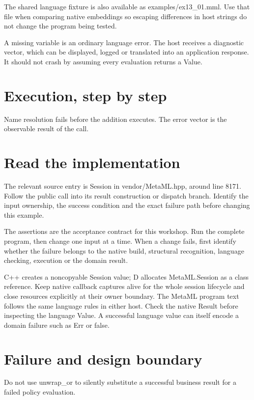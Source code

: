 The shared language fixture is also available as examples/ex13\_01.mml. Use that file when comparing native embeddings so escaping differences in host strings do not change the program being tested.

\clearpage
{}
A missing variable is an ordinary language error. The host receives a diagnostic vector, which can be displayed, logged or translated into an application response. It should not crash by assuming every evaluation returns a Value.


\section*{Execution, step by step}
Name resolution fails before the addition executes. The error vector is the observable result of the call.

\section*{Read the implementation}
The relevant source entry is Session in vendor/MetaML.hpp, around line 8171. Follow the public call into its result construction or dispatch branch. Identify the input ownership, the success condition and the exact failure path before changing this example.

The assertions are the acceptance contract for this workshop. Run the complete program, then change one input at a time. When a change fails, first identify whether the failure belongs to the native build, structural recognition, language checking, execution or the domain result.

\clearpage
{}
C++ creates a noncopyable Session value; D allocates MetaML.Session as a class reference. Keep native callback captures alive for the whole session lifecycle and close resources explicitly at their owner boundary. The MetaML program text follows the same language rules in either host. Check the native Result before inspecting the language Value. A successful language value can itself encode a domain failure such as Err or false.


\section*{Failure and design boundary}
Do not use unwrap\_or to silently substitute a successful business result for a failed policy evaluation.


